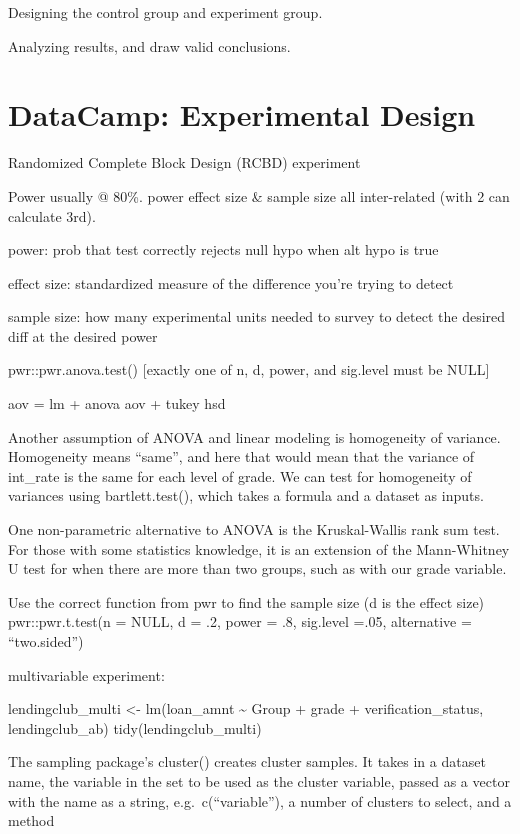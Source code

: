 \documentclass[]{book}
\begin{document}
Designing the control group and experiment group.

Analyzing results, and draw valid conclusions.

\section{DataCamp: Experimental
Design}\label{datacamp-experimental-design}

Randomized Complete Block Design (RCBD) experiment

Power usually @ 80\%. power effect size \& sample size all inter-related
(with 2 can calculate 3rd).

power: prob that test correctly rejects null hypo when alt hypo is true

effect size: standardized measure of the difference you're trying to
detect

sample size: how many experimental units needed to survey to detect the
desired diff at the desired power

pwr::pwr.anova.test() {[}exactly one of n, d, power, and sig.level must
be NULL{]}

aov = lm + anova aov + tukey hsd

Another assumption of ANOVA and linear modeling is homogeneity of
variance. Homogeneity means ``same'', and here that would mean that the
variance of int\_rate is the same for each level of grade. We can test
for homogeneity of variances using bartlett.test(), which takes a
formula and a dataset as inputs.

One non-parametric alternative to ANOVA is the Kruskal-Wallis rank sum
test. For those with some statistics knowledge, it is an extension of
the Mann-Whitney U test for when there are more than two groups, such as
with our grade variable.

Use the correct function from pwr to find the sample size (d is the
effect size) pwr::pwr.t.test(n = NULL, d = .2, power = .8, sig.level
=.05, alternative = ``two.sided'')

multivariable experiment:

lendingclub\_multi \textless{}- lm(loan\_amnt \textasciitilde{} Group +
grade + verification\_status, lendingclub\_ab) tidy(lendingclub\_multi)

The sampling package's cluster() creates cluster samples. It takes in a
dataset name, the variable in the set to be used as the cluster
variable, passed as a vector with the name as a string,
e.g.~c(``variable''), a number of clusters to select, and a method
\end{document}

